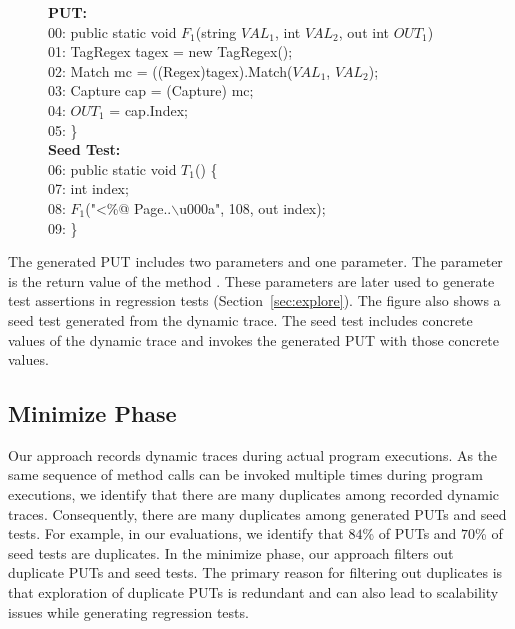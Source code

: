 \begin{figure}[t]
\begin{CodeOut}
\textbf{PUT:}\\
00: public static void $F_1$(string $VAL_1$, int $VAL_2$, out int $OUT_1$)\\
01: \hspace*{0.2in}TagRegex tagex = new TagRegex();\\
02: \hspace*{0.2in}Match mc = ((Regex)tagex).Match($VAL_1$, $VAL_2$);\\
03: \hspace*{0.2in}Capture cap = (Capture) mc;\\
04: \hspace*{0.2in}$OUT_1$ = cap.Index;\\
05: \}\\

\textbf{Seed Test:}\\
06: public static void $T_1$() \{\\
07: \hspace*{0.2in}int index;\\
08: \hspace*{0.2in}$F_1$("<\%@ Page..$\backslash$u000a", 108, out index);\\
09: \}\\
\end{CodeOut}\vspace*{-3ex}
\vspace*{-3ex}
\end{figure}

The generated PUT includes two parameters and one  parameter.
The  parameter is the return value of the method . 
These  parameters are later used to generate test assertions in regression tests (Section~\ref{sec:explore}). 
The figure also shows a seed test generated from the dynamic trace. 
The seed test includes concrete values of the dynamic trace and invokes the generated PUT with those concrete values.

\subsection{Minimize Phase}
\label{sec:minimize}

Our approach records dynamic traces during actual program executions. As the same
sequence of method calls can be invoked multiple times during program executions,
we identify that there are many duplicates among recorded dynamic traces.
Consequently, there are many duplicates among generated PUTs and seed tests. 
For example, in our evaluations, we identify that $84$\% of PUTs and $70$\% of seed
tests are duplicates. In the minimize phase, our approach filters out duplicate PUTs and seed tests.
The primary reason for filtering out duplicates is that exploration of duplicate
PUTs is redundant and can also lead to scalability issues while generating regression tests.

